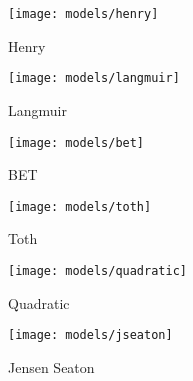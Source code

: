 \begin{figure}[p]
	\centering

	\begin{subfigure}{0.3\linewidth}

		\parbox[c]{1.0\linewidth}{\caption{Henry}%
			\label{pyg:fgr:henryex}}

		\parbox[b]{1.0\linewidth}{%

			\texttt{[image: models/henry]}}
	\end{subfigure}%
	\begin{subfigure}{0.3\linewidth}

		\parbox[c]{1.0\linewidth}{\caption{Langmuir}%
			\label{pyg:fgr:langmuirex}}

		\parbox[b]{1.0\linewidth}{%

			\texttt{[image: models/langmuir]}}
	\end{subfigure}%
	\begin{subfigure}{0.3\linewidth}

		\parbox[c]{1.0\linewidth}{\caption{BET}%
			\label{pyg:fgr:betex}}

		\parbox[b]{1.0\linewidth}{%

			\texttt{[image: models/bet]}}
	\end{subfigure}%

	\begin{subfigure}{0.3\linewidth}

		\parbox[c]{1.0\linewidth}{\caption{Toth}%
			\label{pyg:fgr:tothex}}

		\parbox[b]{1.0\linewidth}{%

			\texttt{[image: models/toth]}}
	\end{subfigure}%
	\begin{subfigure}{0.3\linewidth}

		\parbox[c]{1.0\linewidth}{\caption{Quadratic}%
			\label{pyg:fgr:quadraticex}}

		\parbox[b]{1.0\linewidth}{%

			\texttt{[image: models/quadratic]}}
	\end{subfigure}%
	\begin{subfigure}{0.3\linewidth}

		\parbox[c]{1.0\linewidth}{\caption{Jensen Seaton}%
			\label{pyg:fgr:jseatonex}}

		\parbox[b]{1.0\linewidth}{%

			\texttt{[image: models/jseaton]}}
	\end{subfigure}%
	\\
	\begin{subfigure}{0.3\linewidth}


\end{subfigure}
\end{figure}
